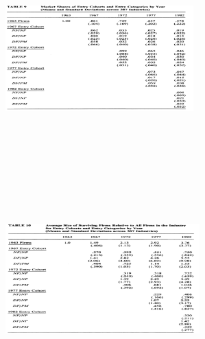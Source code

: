 \documentclass[dvipdfmx,14pt]{beamer}
\begin{document}
\begin{frame}

\begin{center}

\includegraphics[width=7.25cm,height=8cm]{DRS_T9.pdf}

\end{center}

\end{frame}

\begin{frame}

\begin{center}

\includegraphics[width=7.5cm,height=8cm]{DRS_T10.pdf}

\end{center}

\end{frame}
\end{document}

